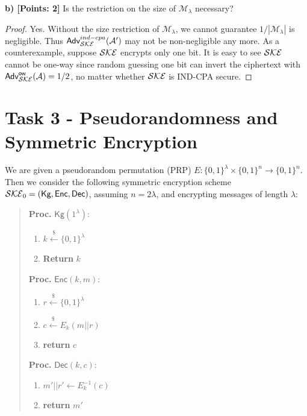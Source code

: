 \documentclass[12pt]{article}
\newcommand{\bits}{\{0,1\}}
\newcommand{\getsr}{\stackrel{\$}{\gets}}
\newcommand{\Adv}{\textsf{Adv}}
\newcommand{\M}{\mathcal{M}}
\theoremstyle{definition}
\newcommand{\Kg}{\textsf{Kg}}
\newcommand{\Enc}{\textsf{Enc}}
\newcommand{\Dec}{\textsf{Dec}}
\newcommand{\A}{\mathcal{A}}
\begin{document}
{\bf b) [Points: 2]} Is the restriction on the size of $\M_{\lambda}$ necessary?
\begin{proof}
Yes. Without the size restriction of $\M_{\lambda}$, we cannot guarantee $1/|\M_{\lambda}|$ is negligible. Thus $\Adv_{\SKE}^{ind-cpa}(\A')$ may not be non-negligible any more. As a counterexample, suppose $\mathcal{SKE}$ encrypts only one bit. It is easy to see $\mathcal{SKE}$ cannot be one-way since random guessing one bit can invert the ciphertext with $\Adv_{\SKE}^{\ow}(\A) = 1/2$, no matter whether $\mathcal{SKE}$ is IND-CPA secure.
\end{proof}

\section{Task 3 - Pseudorandomness and Symmetric Encryption}
We are given a pseudorandom permutation (PRP) $E : \bits^\lambda \times \bits^n \to \bits^n$. Then we consider the following symmetric encryption scheme $\SKE_0 = (\Kg,\Enc,\Dec)$, assuming $n=2\lambda$, and encrypting messages of length $\lambda$:
\begin{quote}
\begin{minipage}[t]{0.25\textwidth}
{\bf Proc.} $\Kg(1^\lambda)$:
\begin{enumerate}
\item $k \getsr \bits^\lambda$
\item {\bf Return} $k$
\end{enumerate}
\end{minipage}
\begin{minipage}[t]{0.3\textwidth}
{\bf Proc.} $\Enc(k, m)$:
\begin{enumerate}
\item $r \getsr \bits^\lambda$
\item $c \getsr E_k (m||r)$
\item {\bf return} $c$
\end{enumerate}
\end{minipage}
\begin{minipage}[t]{0.3\textwidth}
{\bf Proc.} $\Dec(k, c)$:
\begin{enumerate}
\item $m'||r' \gets E_k^{-1} (c)$
\item {\bf return} $m'$
\end{enumerate}
\end{minipage}
\end{quote}
\end{document}
